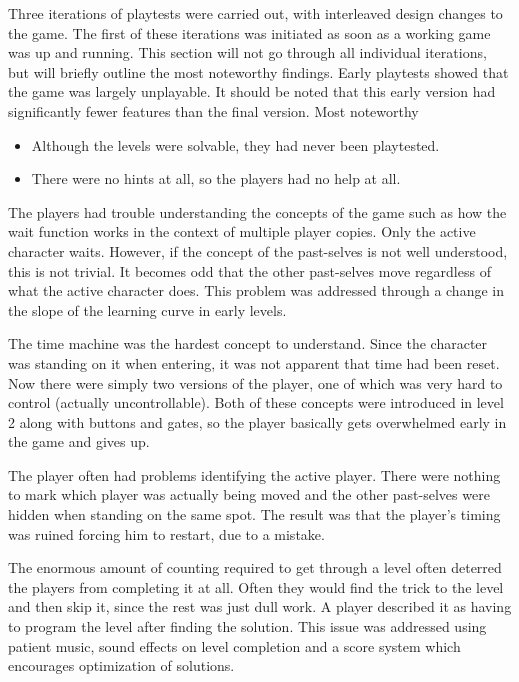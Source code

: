 Three iterations of playtests were carried out, with interleaved
design changes to the game. The first of these iterations was
initiated as soon as a working game was up and running. This section
will not go through all individual iterations, but will briefly
outline the most noteworthy findings.  Early playtests showed that
the game was largely unplayable. It should be noted that this early
version had significantly fewer features than the final version. Most
noteworthy

\begin{itemize}
\item Although the levels were solvable, they had never been playtested.
\item There were no hints at all, so the players had no help at all.
\end{itemize}

The players had trouble understanding the concepts of the game such as
how the wait function works in the context of multiple player
copies. Only the active character waits.  However, if the concept of the
past-selves is not well understood, this is not trivial. It becomes
odd that the other past-selves move regardless of what the active
character does. This problem was addressed through a change in the
slope of the learning curve in early levels.

The time machine was the hardest concept to understand. Since the
character was standing on it when entering, it was not apparent that
time had been reset. Now there were simply two versions of the player,
one of which was very hard to control (actually uncontrollable). Both
of these concepts were introduced in level 2 along with buttons and
gates, so the player basically gets overwhelmed early in the game and
gives up.

The player often had problems identifying the active player. There
were nothing to mark which player was actually being moved and the
other past-selves were hidden when standing on the same spot. The
result was that the player's timing was ruined forcing him to restart,
due to a mistake.

The enormous amount of counting required to get through a level often
deterred the players from completing it at all. Often they would find
the trick to the level and then skip it, since the rest was just dull
work. A player described it as having to program the level after
finding the solution. This issue was addressed using patient music,
sound effects on level completion and a score system which encourages
optimization of solutions.

